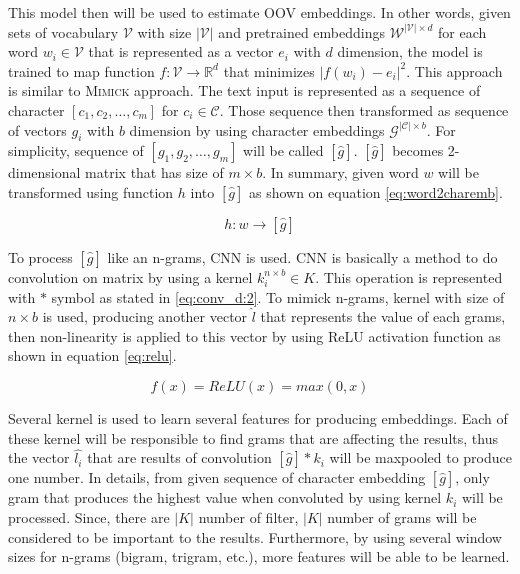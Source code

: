        This model then will be used to estimate OOV embeddings. In
        other words, given sets of vocabulary $\mathcal{V}$ with size
        $\vert\mathcal{V}\vert$ and pretrained embeddings
        $\mathcal{W}^{\vert\mathcal{V}\vert \times d}$ for each word
        $w_{i} \in \mathcal{V}$ that is represented as a vector $e_i$
        with $d$ dimension, the model is trained to map function
        $f:\mathcal{V} \rightarrow \mathbb{R}^d$ that minimizes $\vert
        f(w_i) - e_i
        \vert^{2}$. This approach is similar to \textsc{Mimick}
        \citep{mimicking2017Pinter} approach. The text input is
        represented as a sequence of character $[c_1, c_2, \dots,
        c_m]$ for $c_i \in \mathcal{C}$. Those sequence then
        transformed as sequence of vectors $g_i$ with $b$ dimension by
        using character embeddings $\mathcal{G}^{\vert \mathcal{C}
        \vert \times b}$. For simplicity, sequence of $[g_1, g_2,
        \dots, g_m]$ will be called $[\hat{g}]$. $[\hat{g}]$ becomes
        2-dimensional matrix that has size of $m \times b$. In
        summary, given word $w$ will be transformed using function $h$
        into $[\hat{g}]$ as shown on equation \ref{eq:word2charemb}.

        \begin{equation}
            \label{eq:word2charemb}
            h: w \rightarrow [\hat{g}]
        \end{equation}

        To process $[\hat{g}]$ like an n-grams, CNN is used. CNN is
        basically a method to do convolution on matrix by using a
        kernel $k_i^{n \times b} \in K$. This operation is represented
        with $*$ symbol as stated in \ref{eq:conv_d:2}. To mimick
        n-grams, kernel with size of $n \times b$ is used, producing
        another vector $\hat{l}$ that represents the value of each
        grams, then non-linearity is applied to this vector by using
        ReLU activation function as shown in equation \ref{eq:relu}.

        \begin{equation}
            \label{eq:relu}
            f(x) = ReLU(x) = max(0,x)
        \end{equation}

        Several kernel is used to learn several features for producing
        embeddings. Each of these kernel will be responsible to find
        grams that are affecting the results, thus the vector
        $\hat{l_i}$ that are results of convolution $[\hat{g}] * k_i$
        will be maxpooled to produce one number. In details, from
        given sequence of character embedding $[\hat{g}]$, only gram
        that produces the highest value when convoluted by using
        kernel $k_i$ will be processed. Since, there are $\vert K
        \vert$ number of filter, $\vert K \vert$ number of grams will
        be considered to be important to the results. Furthermore, by
        using several window sizes for n-grams (bigram, trigram,
        etc.), more features will be able to be learned.


